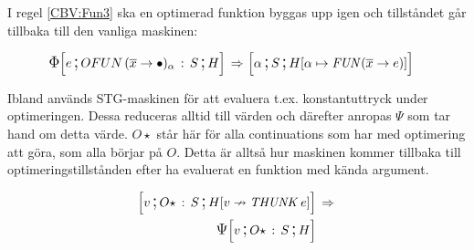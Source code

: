 \documentclass[../Optimise]{subfiles}
\begin{document}
 I regel \eqref{CBV:Fun3} ska en optimerad funktion byggas upp igen och tillståndet
 går tillbaka till den vanliga maskinen:

\begin{align}
\label{CBV:Fun3} \IRR{\cOFUN{\many{x}}{\alpha}S}He  \rulesep &\, \mc{\alpha}S{\heap{\alpha}{\FUN{\many{x}}e}}
\end{align}

Ibland används STG-maskinen för att evaluera t.ex. konstantuttryck under optimeringen.
Dessa reduceras alltid till värden och därefter anropas $\Psi$ som tar hand 
om detta värde. $O\star$ står här för alla continuations som har med optimering
att göra, som alla börjar på $O$. Detta är alltså hur maskinen kommer 
tillbaka till optimeringstillstånden efter ha evaluerat en funktion med 
kända argument.

\begin{align}
\mc v{O\star\,:\, S}{\nheap v{\THUNK e}} & \rulesep\\
\PSI{O\star\,:\, S}Hv \nonumber
\end{align}

%
%
%
%
%
\end{document}
